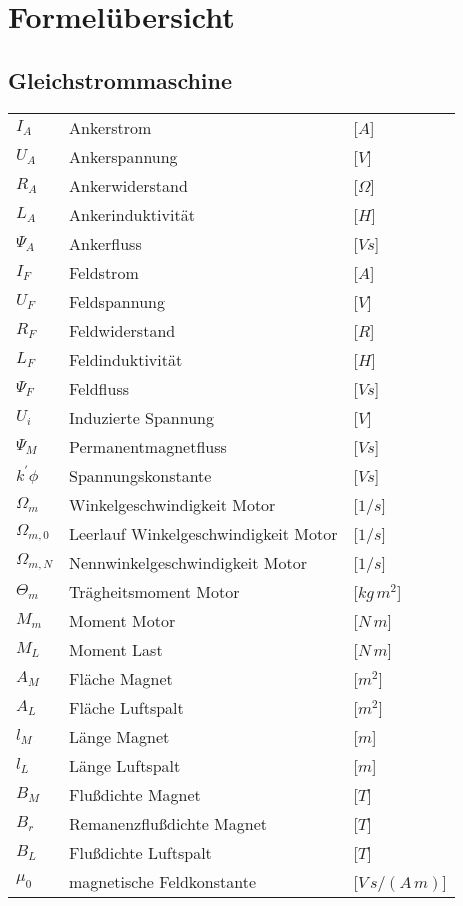 \section{Formelübersicht} %
\subsection{Gleichstrommaschine} %
\begin{tabular}{L{2cm}lR{2cm}}
	$I_A$  &Ankerstrom  &[$A$]\\
	$U_A$ &Ankerspannung & [$V$]\\
	$R_A$  &Ankerwiderstand &[$ \Omega $] \\
	$L_A$  &Ankerinduktivität &[$H$]\\
	$\Psi_A$ &Ankerfluss & [$Vs$]\\
	$I_F$ & Feldstrom & [$A$]\\
	$U_F$ & Feldspannung & [$V$]\\
	$R_F$ & Feldwiderstand & [$R$]\\
	$L_F$ & Feldinduktivität & [$H$]\\
	$\Psi_F$ &Feldfluss & [$Vs$]\\
	$U_i$ &Induzierte Spannung & [$V$]\\
	$\Psi_M$ &Permanentmagnetfluss & [$Vs$]\\
	$k^{'} \phi$ &Spannungskonstante & [$Vs$]\\
	$\Omega_m$ &Winkelgeschwindigkeit Motor & [$1/s$]\\
	$\Omega_{m,0}$ &Leerlauf Winkelgeschwindigkeit Motor & [$1/s$]\\
	$\Omega_{m,N}$ &Nennwinkelgeschwindigkeit Motor & [$1/s$]\\
	$\Theta_m$ &Trägheitsmoment Motor & [$kg \, m^{2}$]\\
	$M_m$ &Moment Motor & [$N\,m$]\\
	$M_L$ &Moment Last & [$N\,m$]\\
	$A_M$ &Fläche Magnet & [$m^{2}$]\\
	$A_L$ &Fläche Luftspalt & [$m^{2}$]\\
	$l_M$ &Länge Magnet & [$m$]\\
	$l_L$ &Länge Luftspalt & [$m$]\\
	$B_M$ &Flußdichte Magnet & [$T$]\\
	$B_r$ &Remanenzflußdichte Magnet & [$T$]\\
	$B_L$ &Flußdichte Luftspalt & [$T$]\\
	$\mu_0$ &magnetische Feldkonstante & [$V\,s/ (A \, m)$]\\
\end{tabular}\\
